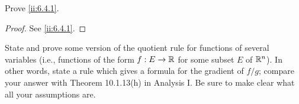 \begin{ex}\label{ii:ex:6.4.3}
  Prove \cref{ii:6.4.1}.
\end{ex}

\begin{proof}
  See \cref{ii:6.4.1}.
\end{proof}

\begin{ex}\label{ii:ex:6.4.4}
  State and prove some version of the quotient rule for functions of several variables (i.e., functions of the form \(f : E \to \mathbb{R}\) for some subset \(E\) of \(\mathbb{R}^n\)).
  In other words, state a rule which gives a formula for the gradient of \(f / g\);
  compare your answer with Theorem 10.1.13(h) in Analysis I.
  Be sure to make clear what all your assumptions are.
\end{ex}

